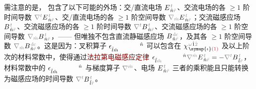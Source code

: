 需注意的是， 包含了以下可能的外场：交/直流电场 $E^{\;\!\mathcolor{gray}{t}}_{\;\! \hat{n} \mathcolor{gray}{\bar{r}}}$、交流电场的各 $\geq 1$ 阶时间导数 $\mathcolor{gray}{\nabla^t} E^{\;\!\mathcolor{gray}{t}}_{\;\! \hat{n} \mathcolor{gray}{\bar{r}}}$、交/直流电场的各 $\geq 1$ 阶空间导数 $\mathcolor{gray}{\nabla_{\hat{m}}} E^{\;\!\mathcolor{gray}{t}}_{\;\! \hat{n} \mathcolor{gray}{\bar{r}}}$；交流磁感应场 $B^{\;\!\mathcolor{gray}{t}}_{\;\! \hat{n} \mathcolor{gray}{\bar{r}}}$、交流磁感应场的各 $\geq 1$ 阶时间导数 $\mathcolor{gray}{\nabla^t} B^{\;\!\mathcolor{gray}{t}}_{\;\! \hat{n} \mathcolor{gray}{\bar{r}}}$、交流磁感应场的各 $\geq 1$ 阶空间导数 $\mathcolor{gray}{\nabla_{\hat{m}}} B^{\;\!\mathcolor{gray}{t}}_{\;\! \hat{n} \mathcolor{gray}{\bar{r}}}$，—— 但唯独不包含直流静磁感应场 $B^{\;\!\mathcolor{gray}{\text{dc}}}_{\;\! \hat{n} \mathcolor{gray}{\bar{r}}}$，及其各 $\geq 1$ 阶空间导数 $\mathcolor{gray}{\nabla_{\hat{m}}} B^{\;\!\mathcolor{gray}{\text{dc}}}_{\;\! \hat{n} \mathcolor{gray}{\bar{r}}}$。这是因为：叉积算子 $\epsilon^{\hphantom{\symup{\iota}\hat{m}}\hat{n}}_{\hat{l}\hat{m}}$ 可以包含在 $\chi^{\;\! \mathcolor{gray}{\omega} \hat{1} \mathcolor{gray}{\hat{2}}}_{\;\! \symup{\iota} \textcolor{Maroon}{(1)}}$ 及以上阶次的材料常数中，使得通过\textcolor{Maroon}{法拉第电磁感应定律} $\epsilon^{\hphantom{\symup{\iota}\hat{m}}\hat{n}}_{\hat{l}\mathcolor{gray}{\hat{m}}} \mathcolor{gray}{\nabla^{\hat{m}}} E^{\;\!\mathcolor{gray}{t}}_{\;\! \hat{n} \mathcolor{gray}{\bar{r}}} = - \mathcolor{gray}{\nabla^t} B^{\;\!\mathcolor{gray}{t}}_{\;\! \hat{l} \mathcolor{gray}{\bar{r}}}$，材料常数中的 $\epsilon^{\hphantom{\symup{\iota}\hat{m}}\hat{n}}_{\hat{l}\hat{m}}$ 与梯度算子 $\mathcolor{gray}{\nabla^{\hat{m}}}$、电场 $E^{\;\!\mathcolor{gray}{t}}_{\;\! \hat{n} \mathcolor{gray}{\bar{r}}}$ 三者的乘积能且只能转换为磁感应场的时间导数 $\mathcolor{gray}{\nabla^t} B^{\;\!\mathcolor{gray}{t}}_{\;\! \hat{l} \mathcolor{gray}{\bar{r}}}$。

